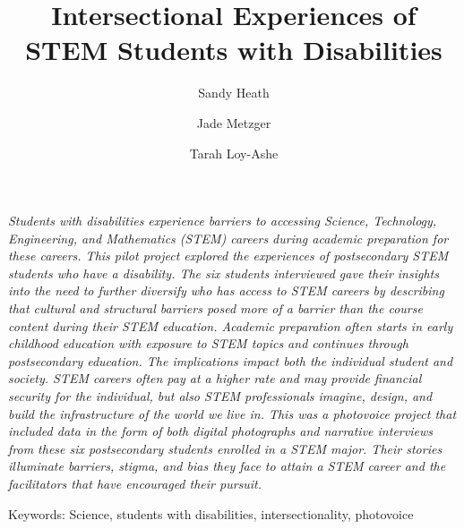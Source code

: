 \documentclass{sig-alternate} %
\makeatletter
\let\oldabstract\abstract
\let\oldendabstract\endabstract
\renewenvironment{abstract} %
{\renewenvironment{quotation}%
        {\list{}{\addtolength{\leftmargin}{1em} %
            \listparindent 1.5em%
            \itemindent  \listparindent%
            \rightmargin  \leftmargin%
            \parsep    \z@ \@plus\p@}%
        \item\relax}%
        {\endlist}%
\oldabstract}
{\oldendabstract}
\makeatother
\begin{document}
\title{Intersectional Experiences of STEM Students with Disabilities}

\author[1]{\large \color{blue} Sandy Heath} %
\author[2]{\large \color{blue} Jade Metzger}
\author[3]{\large \color{blue} Tarah Loy-Ashe}


\maketitle %
\begin{@twocolumnfalse} 
\begin{abstract}
\item %
\begin{large}
\textit{Students with disabilities experience barriers to accessing Science, Technology, Engineering, and Mathematics (STEM) careers during academic preparation for these careers. This pilot project explored the experiences of postsecondary STEM students who have a disability. The six students interviewed gave their insights into the need to further diversify who has access to STEM careers by describing that cultural and structural barriers posed more of a barrier than the course content during their STEM education. Academic preparation often starts in early childhood education with exposure to STEM topics and continues through postsecondary education. The implications impact both the individual student and society. STEM careers often pay at a higher rate and may provide financial security for the individual, but also STEM professionals imagine, design, and build the infrastructure of the world we live in. This was a photovoice project that included data in the form of both digital photographs and narrative interviews from these six postsecondary students enrolled in a STEM major. Their stories illuminate barriers, stigma, and bias they face to attain a STEM career and the facilitators that have encouraged their pursuit.}
\item Keywords: Science, students with disabilities, intersectionality, photovoice

\end{large}   
\end{abstract}
\end{@twocolumnfalse}
\end{document}

